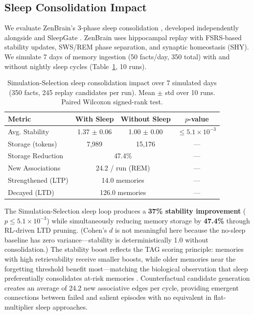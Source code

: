 \documentclass{article}
\begin{document}
\subsection{Sleep Consolidation Impact}
\label{app:sleep-impact}

We evaluate ZenBrain's 3-phase sleep consolidation
\citep{stickgold2013}, developed independently alongside
\citet{liu2025lightmem} and SleepGate \citep{xie2026sleepgate}.
ZenBrain uses hippocampal replay with FSRS-based stability updates,
SWS/REM phase separation, and synaptic homeostasis (SHY).
We simulate 7 days of memory ingestion (50 facts/day, 350 total)
with and without nightly sleep cycles (Table~\ref{tab:sleep}, 10 runs).

\begin{table}[h]
    \caption{Simulation-Selection sleep consolidation impact over 7 simulated days
    (350 facts, 245 replay candidates per run).
    Mean $\pm$ std over 10 runs. Paired Wilcoxon signed-rank test.}
    \label{tab:sleep}
    \centering
    \begin{tabular}{lccc}
        \toprule
        Metric & With Sleep & Without Sleep & $p$-value \\
        \midrule
        Avg. Stability & 1.37 $\pm$ 0.06 & 1.00 $\pm$ 0.00 & $\le 5.1\times 10^{-3}$ \\
        Storage (tokens) & 7{,}989 & 15{,}176 & --- \\
        Storage Reduction & \multicolumn{2}{c}{47.4\%} & --- \\
        New Associations & \multicolumn{2}{c}{24.2 / run (REM)} & --- \\
        Strengthened (LTP) & \multicolumn{2}{c}{14.0 memories} & --- \\
        Decayed (LTD) & \multicolumn{2}{c}{126.0 memories} & --- \\
        \bottomrule
    \end{tabular}
\end{table}

The Simulation-Selection sleep loop produces a \textbf{37\% stability improvement}
($p \le 5.1\times 10^{-3}$) while simultaneously
reducing memory storage by \textbf{47.4\%} through RL-driven LTD pruning.
(Cohen's $d$ is not meaningful here because the no-sleep baseline has
zero variance---stability is deterministically 1.0 without consolidation.)
The stability boost reflects the TAG scoring principle: memories with
high retrievability receive smaller boosts, while older memories near
the forgetting threshold benefit most---matching the biological observation
that sleep preferentially consolidates at-risk memories \citep{stickgold2013,oneill2010}.
Counterfactual candidate generation creates an average of 24.2 new
associative edges per cycle, providing emergent connections between
failed and salient episodes \citep{mcgaugh2004}
with no equivalent in flat-multiplier sleep approaches.
\end{document}
